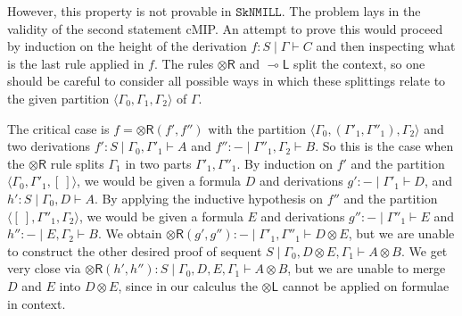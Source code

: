 \documentclass[sn-mathphys-num]{sn-jnl}%
\newcommand{\GG}{\Gamma}
\newcommand{\vd}{\vdash}
\newcommand{\tl}{\otimes \mathsf{L}}
\newcommand{\tr}{\otimes\mathsf{R}}
\newcommand{\ot}{\otimes}
\newcommand{\lolli}{\multimap}
\newcommand{\lleft}{{\lolli}\mathsf{L}}
\newcommand{\SkNMILL}{$\mathtt{SkNMILL}$}
\newcommand{\cMIP}{\textsf{cMIP}}
\theoremstyle{thmstyleone}%
\theoremstyle{thmstyletwo}%
\theoremstyle{thmstylethree}%
\begin{document}
However, this property is not provable in \SkNMILL. The problem lays in the validity of the second statement \cMIP. An attempt to prove this would proceed by induction on the height of the derivation $f : S \mid \GG \vdash C$ and then inspecting what is the last rule applied in $f$. The rules $\tr$ and $\lleft$ split the context, so one should be careful to consider all possible ways in which these splittings relate to the given partition $\langle \GG_0,\GG_1, \GG_2 \rangle$ of $\GG$.

The critical case is $f = \tr (f',f'')$ with the partition $\langle \GG_0, (\GG'_1, \GG''_1), \GG_2\rangle$ and two derivations $f' : S \mid \GG_0 , \GG'_1 \vd A$ and $f'' : {-} \mid \GG''_1 , \GG_2 \vd B$. So this is the case when the $\tr$ rule splits $\GG_1$ in two parts $\GG'_1,\GG''_1$.
By induction on $f'$ and the partition $\langle \GG_0 , \GG'_1, [\ ] \rangle$, we would be given a formula $D$ and derivations $g' : {-} \mid \GG'_1 \vd D$, and $h': S \mid \GG_0 , D \vd A$. By applying the inductive hypothesis on $f''$ and the partition $\langle [\ ], \GG''_1, \GG_2\rangle$, we would be given a formula $E$ and derivations $g'' : {-} \mid \GG''_1 \vd E$ and $h'': {-} \mid E, \GG_2 \vd B$.
We obtain $\tr (g',g'') : {-} \mid \GG'_1, \GG''_1 \vd D \ot E$, but we are unable to construct the other desired proof of sequent $S \mid \GG_0, D \ot E, \GG_1 \vd A \ot B$. We get very close via $\tr (h', h'') : S \mid \GG_0, D, E, \GG_1 \vd A \ot B$, but we are unable to merge $D$ and $E$ into $D \ot E$, since in our calculus the $\tl$ cannot be applied on formulae in context.
\end{document}
